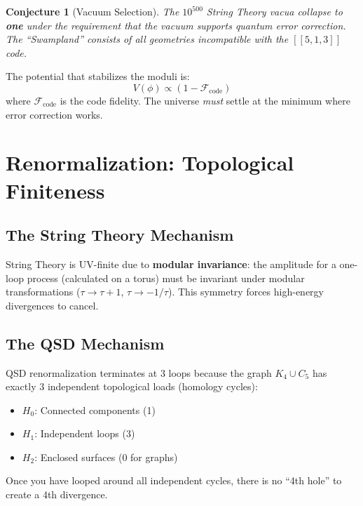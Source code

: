 \documentclass[11pt,a4paper]{article}
\newtheorem{conjecture}[theorem]{Conjecture}
\theoremstyle{definition}
\begin{document}
\begin{conjecture}[Vacuum Selection]
The $10^{500}$ String Theory vacua collapse to \textbf{one} under the requirement that the vacuum supports quantum error correction. The ``Swampland'' consists of all geometries incompatible with the $[[5,1,3]]$ code.
\end{conjecture}

The potential that stabilizes the moduli is:
\begin{equation}
V(\phi) \propto (1 - \mathcal{F}_{\text{code}})
\end{equation}
where $\mathcal{F}_{\text{code}}$ is the code fidelity. The universe \emph{must} settle at the minimum where error correction works.

\section{Renormalization: Topological Finiteness}
\label{sec:renorm}

\subsection{The String Theory Mechanism}

String Theory is UV-finite due to \textbf{modular invariance}: the amplitude for a one-loop process (calculated on a torus) must be invariant under modular transformations ($\tau \to \tau + 1$, $\tau \to -1/\tau$). This symmetry forces high-energy divergences to cancel.

\subsection{The QSD Mechanism}

QSD renormalization terminates at 3 loops because the graph $K_4 \cup C_5$ has exactly 3 independent topological loads (homology cycles):
\begin{itemize}[nosep]
    \item $H_0$: Connected components (1)
    \item $H_1$: Independent loops (3)
    \item $H_2$: Enclosed surfaces (0 for graphs)
\end{itemize}

Once you have looped around all independent cycles, there is no ``4th hole'' to create a 4th divergence.
\end{document}
